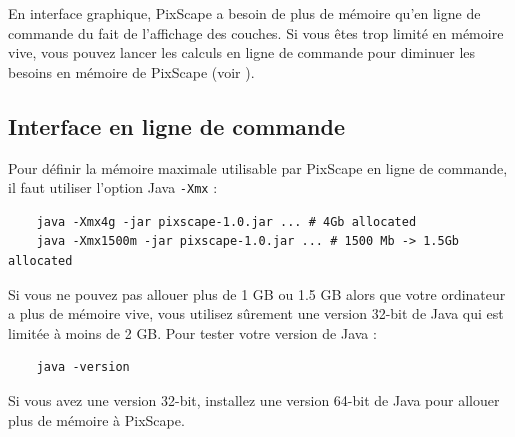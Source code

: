 \documentclass{report}
\begin{document}
En interface graphique, PixScape a besoin de plus de mémoire qu'en ligne de commande du fait de l'affichage des couches. Si vous êtes trop limité en mémoire vive, vous pouvez lancer les calculs en ligne de commande pour diminuer les besoins en mémoire de PixScape (voir ).

\subsection{Interface en ligne de commande}
Pour définir la mémoire maximale utilisable par PixScape en ligne de commande, il faut utiliser l'option Java \verb|-Xmx| :
\begin{Verbatim}
	java -Xmx4g -jar pixscape-1.0.jar ... # 4Gb allocated
	java -Xmx1500m -jar pixscape-1.0.jar ... # 1500 Mb -> 1.5Gb allocated
\end{Verbatim}


Si vous ne pouvez pas allouer plus de 1 GB ou 1.5 GB alors que votre ordinateur a plus de mémoire vive, vous utilisez sûrement une version 32-bit de Java qui est limitée à moins de 2 GB.
Pour tester votre version de Java :
\begin{Verbatim}
	java -version
\end{Verbatim}
Si vous avez une version 32-bit, installez une version 64-bit de Java pour allouer plus de mémoire à PixScape.


\end{document}
